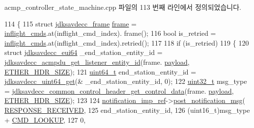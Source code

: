 acmp\+\_\+controller\+\_\+state\+\_\+machine.\+cpp 파일의 113 번째 라인에서 정의되었습니다.


\begin{DoxyCode}
114 \{
115     \textcolor{keyword}{struct }\hyperlink{structjdksavdecc__frame}{jdksavdecc\_frame} \hyperlink{gst__avb__playbin_8c_ac8e710e0b5e994c0545d75d69868c6f0}{frame} = \hyperlink{classavdecc__lib_1_1acmp__controller__state__machine_a0475b054c1890c88809394d9cef2a4c0}{inflight\_cmds}.at(inflight\_cmd\_index).
      frame();
116     \textcolor{keywordtype}{bool} is\_retried = \hyperlink{classavdecc__lib_1_1acmp__controller__state__machine_a0475b054c1890c88809394d9cef2a4c0}{inflight\_cmds}.at(inflight\_cmd\_index).retried();
117 
118     \textcolor{keywordflow}{if} (is\_retried)
119     \{
120         \textcolor{keyword}{struct }\hyperlink{structjdksavdecc__eui64}{jdksavdecc\_eui64} \_end\_station\_entity\_id = 
      \hyperlink{group__acmpdu_ga138eb586d71333fa5c27c226373c771f}{jdksavdecc\_acmpdu\_get\_listener\_entity\_id}(frame.
      \hyperlink{structjdksavdecc__frame_a220ad076814a31ae0163e722e523de46}{payload}, \hyperlink{namespaceavdecc__lib_a6c827b1a0d973e18119c5e3da518e65ca9512ad9b34302ba7048d88197e0a2dc0}{ETHER\_HDR\_SIZE});
121         \hyperlink{parse_8c_aec6fcb673ff035718c238c8c9d544c47}{uint64\_t} end\_station\_entity\_id = \hyperlink{group__endian_gac8c2b48b7d7db101708e0197e366ac42}{jdksavdecc\_uint64\_get}(&
      \_end\_station\_entity\_id, 0);
122         \hyperlink{parse_8c_a6eb1e68cc391dd753bc8ce896dbb8315}{uint32\_t} msg\_type = 
      \hyperlink{group__jdksavdecc__avtp__common__control__header_gacb435e5d647474931972cb9eb93b4e41}{jdksavdecc\_common\_control\_header\_get\_control\_data}(frame.
      \hyperlink{structjdksavdecc__frame_a220ad076814a31ae0163e722e523de46}{payload}, \hyperlink{namespaceavdecc__lib_a6c827b1a0d973e18119c5e3da518e65ca9512ad9b34302ba7048d88197e0a2dc0}{ETHER\_HDR\_SIZE});
123 
124         \hyperlink{namespaceavdecc__lib_aca078f7550e970a17b3f732c26bc3d83}{notification\_imp\_ref}->\hyperlink{classavdecc__lib_1_1notification_a2775ca78354ea78d68bf107c084b3822}{post\_notification\_msg}(
      \hyperlink{namespaceavdecc__lib_ad2a3e740ca3019cf9fd0f9514afb6419a76526acf7fff481667c4ec404347c3ce}{RESPONSE\_RECEIVED},
125                                                     end\_station\_entity\_id,
126                                                     (uint16\_t)msg\_type + 
      \hyperlink{namespaceavdecc__lib_ab6b306ef981f5e21bb41ea2c2dbe8cd9a3d122abbe03d5d839b4708ad02b7586d}{CMD\_LOOKUP},
127                                                     0,

\end{DoxyCode}
